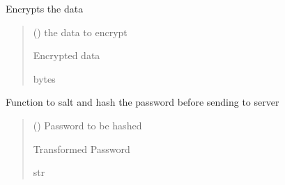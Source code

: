 \documentclass[letterpaper,10pt,english]{sphinxmanual}
\begin{document}
\begin{fulllineitems}

\begin{fulllineitems}
\label{\detokenize{Message:Message.Message._encrypt_server}}
\pysigstartsignatures
{}
\pysigstopsignatures
\sphinxAtStartPar
Encrypts the data
\begin{quote}\begin{description}
\sphinxAtStartPar
{} () \textendash{} the data to encrypt

\sphinxAtStartPar
Encrypted data

\sphinxAtStartPar
bytes

\end{description}\end{quote}

\end{fulllineitems}


\begin{fulllineitems}
\label{\detokenize{Message:Message.Message._hash_password}}
\pysigstartsignatures
{}
\pysigstopsignatures
\sphinxAtStartPar
Function to salt and hash the password before sending to server
\begin{quote}\begin{description}
\sphinxAtStartPar
{} () \textendash{} Password to be hashed

\sphinxAtStartPar
Transformed Password

\sphinxAtStartPar
str

\end{description}\end{quote}

\end{fulllineitems}



\end{fulllineitems}
\end{document}
